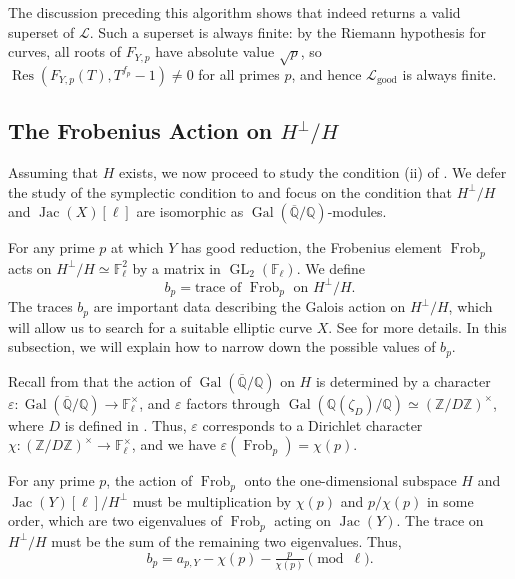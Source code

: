 \documentclass{amsproc}
\numberwithin{equation}{section}
\theoremstyle{definition}
\theoremstyle{remark}
\DeclareMathOperator{\Jac}{Jac}
\DeclareMathOperator{\GL}{GL}
\DeclareMathOperator{\Frob}{Frob}
\DeclareMathOperator{\Gal}{Gal}
\DeclareMathOperator{\Res}{Res}
\newcommand{\eps}{\varepsilon}
\newcommand{\ZZ}{\mathbb Z}
\newcommand{\QQ}{\mathbb Q}
\newcommand{\FF}{\mathbb F}
\newcommand{\Qbar}{\overline{\QQ}}
\newcommand{\GalQ}{\Gal(\Qbar/\QQ)}
\begin{document}
The discussion preceding this algorithm shows that  indeed returns a valid superset of $\mathcal L$. Such a superset is always finite: by the Riemann hypothesis for curves, all roots of $F_{Y,p}$ have absolute value $\sqrt p$, so $\Res(F_{Y,p}(T), T^{f_p}-1)\neq 0$ for all primes $p$, and hence $\mathcal L_{\text{good}}$ is always finite.

\subsection{The Frobenius Action on \texorpdfstring{$H^\perp/H$}{Hperp/H}}
\label{subsec:frob_action}
Assuming that $H$ exists, we now proceed to study the condition (ii) of . We defer the study of the symplectic condition to  and focus on the condition that $H^\perp/H$ and $\Jac(X)[\ell]$ are isomorphic as $\GalQ$-modules.

For any prime $p$ at which $Y$ has good reduction, 
the Frobenius element $\Frob_p$
acts on $H^\perp/H \simeq \FF_\ell^2$ by a matrix in $\GL_2(\FF_\ell)$.
We define
\begin{equation}
    \label{eq:trace_Hperp_def}
    b_p = \text{trace of } \Frob_p \text{ on } H^\perp/H.
\end{equation}
The traces $b_p$ are important data describing the Galois action on $H^\perp/H$, which will allow us to search for a suitable elliptic curve $X$. See  for more details.
In this subsection, we will explain how to narrow down the possible values of $b_p$.

Recall from  that the action of $\GalQ$ on $H$ is determined by a character $\eps : \GalQ \to \FF_\ell^\times$, 
and $\eps$ factors through $\Gal(\QQ(\zeta_D)/\QQ)\simeq (\ZZ/D\ZZ)^\times$, 
where $D$ is defined in . 
Thus, $\eps$ corresponds to a Dirichlet character $\chi : (\ZZ/D\ZZ)^\times \to \FF_\ell^\times$,
and we have $\eps(\Frob_p) = \chi(p)$.

For any prime $p$, the action of $\Frob_p$ onto
the one-dimensional subspace $H$ and $\Jac(Y)[\ell]/H^\perp$ 
must be multiplication by $\chi(p)$ and $p/\chi(p)$ in some order,
which are two eigenvalues of $\Frob_p$ acting on $\Jac(Y)$.
The trace on $H^\perp/H$ must be the sum of 
the remaining two eigenvalues. Thus,
\begin{equation}    
    \label{eq:frob_trace_recover}
    b_p = a_{p,Y} - \chi(p) - \tfrac{p}{\chi(p)} \pmod\ell.
\end{equation}
\end{document}
